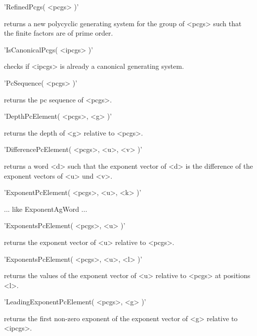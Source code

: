 'RefinedPcgs( <pcgs> )'

returns a new  polycyclic generating system  for the group of <pcgs> such
that the finite factors are of prime order.


'IsCanonicalPcgs( <ipcgs> )'

checks if <ipcgs> is already a canonical generating system.


'PcSequence( <pcgs> )'

returns the pc sequence of <pcgs>.


'DepthPcElement( <pcgs>, <g> )'

returns the depth of <g> relative to <pcgs>.


'DifferencePcElement( <pcgs>, <u>, <v> )'

returns a word <d> such that the exponent vector of <d> is the difference
of the exponent vectors of <u> und <v>.


'ExponentPcElement( <pcgs>, <u>, <k> )'

... like ExponentAgWord ...


'ExponentsPcElement( <pcgs>, <u> )'

returns the exponent vector of <u> relative to <pcgs>.

'ExponentsPcElement( <pcgs>, <u>, <l> )'

returns the  values of the exponent  vector of <u>  relative to <pcgs> at
positions <l>.


'LeadingExponentPcElement( <pcgs>, <g> )'

returns the first  non-zero  exponent  of  the  exponent vector of    <g>
relative to <ipcgs>.

